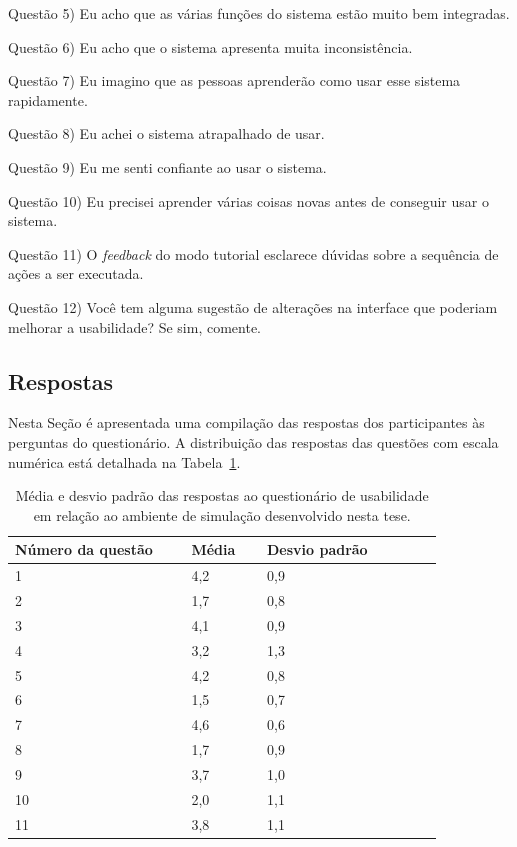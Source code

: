 Questão 5) Eu acho que as várias funções do sistema estão muito bem integradas.

Questão 6) Eu acho que o sistema apresenta muita inconsistência.

Questão 7) Eu imagino que as pessoas aprenderão como usar esse sistema rapidamente.

Questão 8) Eu achei o sistema atrapalhado de usar.

Questão 9) Eu me senti confiante ao usar o sistema.

Questão 10) Eu precisei aprender várias coisas novas antes de conseguir usar o sistema.

Questão 11) O \textit{feedback} do modo tutorial esclarece dúvidas sobre a sequência de ações a ser executada.

Questão 12) Você tem alguma sugestão de alterações na interface que poderiam melhorar a usabilidade? Se sim, comente.

\subsection{Respostas}
\label{sec:respostasUsabilidade}

Nesta Seção é apresentada uma compilação das respostas dos participantes às perguntas do questionário. A distribuição das respostas das questões com escala numérica está detalhada na Tabela~\ref{tab:respotasQuestionarioUsabilidade}.

\begin{table}[!ht]
\begin{center}
\caption{Média e desvio padrão das respostas ao questionário de usabilidade em relação ao ambiente de simulação desenvolvido nesta tese.}
\label{tab:respotasQuestionarioUsabilidade}
\begin{tabular}{|p{0.35\linewidth}|p{0.15\linewidth}|p{0.35\linewidth}|}
\hline
\textbf{Número da questão} & \textbf{Média} & \textbf{Desvio padrão}\\
\hline\hline
1 & 4,2 & 0,9\\
2 & 1,7 & 0,8\\
3 & 4,1 & 0,9\\
4 & 3,2 & 1,3\\
5 & 4,2 & 0,8\\
6 & 1,5 & 0,7\\
7 & 4,6 & 0,6\\
8 & 1,7 & 0,9\\
9 & 3,7 & 1,0\\
10 & 2,0 & 1,1\\
11 & 3,8 & 1,1\\
\hline
\end{tabular}
\end{center}
\end{table} 

